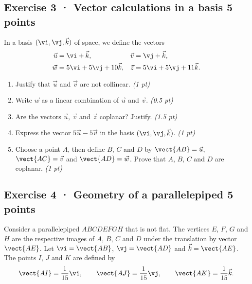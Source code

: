 \mxnewpage{}

\subsection*{Exercise 3 · Vector calculations in a basis \hfill 5 points}In a basis $(\vi,\vj,\vec k)$ of space, we define the vectors
\[\begin{aligned}\vec u&=\vi+\vec k,&\vec v&=\vj+\vec k,\\
\vec w&=5\vi+5\vj+10\vec k,&\vec z&=5\vi+5\vj+11\vec k.\end{aligned}\]

\begin{enumerate}

\item Justify that $\vec u$ and $\vec v$ are not collinear. \hfill\textit{(1 pt)}

\item Write $\vec w$ as a linear combination of $\vec u$ and $\vec v$. \hfill\textit{(0.5 pt)}

\item Are the vectors $\vec u$, $\vec v$ and $\vec z$ coplanar? Justify. \hfill\textit{(1.5 pt)}

\item Express the vector $5\vec u-5\vec v$ in the basis $(\vi,\vj,\vec k)$. \hfill\textit{(1 pt)}

\item Choose a point $A$, then define $B$, $C$ and $D$ by $\vect{AB}=\vec u$, $\vect{AC}=\vec v$ and $\vect{AD}=\vec w$. Prove that $A$, $B$, $C$ and $D$ are coplanar. \hfill\textit{(1 pt)}

\end{enumerate}

\subsection*{Exercise 4 · Geometry of a parallelepiped \hfill 5 points}Consider a parallelepiped $ABCDEFGH$ that is not flat. The vertices $E$, $F$, $G$ and $H$ are the respective images of $A$, $B$, $C$ and $D$ under the translation by vector $\vect{AE}$.
Let $\vi=\vect{AB}$, $\vj=\vect{AD}$ and $\vec k=\vect{AE}$.
The points $I$, $J$ and $K$ are defined by
\[\vect{AI}=\frac1{15}\vi,\qquad\vect{AJ}=\frac1{15}\vj,\qquad\vect{AK}=\frac1{15}\vec k.\]


